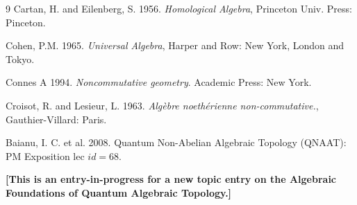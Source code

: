 \documentclass[12pt]{article}
\theoremstyle{plain}
\theoremstyle{definition}
\numberwithin{equation}{section}
\newcommand{\<}{{\langle}}
\begin{document}
\begin{thebibliography} {9}
Cartan, H. and Eilenberg, S. 1956. {\em Homological Algebra}, Princeton Univ. Press: Pinceton. 


Cohen, P.M. 1965. {\em Universal Algebra}, Harper and Row: New York, London and Tokyo.

Connes A 1994. \emph{Noncommutative geometry}. Academic Press: New York.

Croisot, R. and Lesieur, L. 1963. \emph{Alg\`ebre noeth\'erienne non-commutative.},
Gauthier-Villard: Paris.

Baianu, I. C. et al. 2008. Quantum Non-Abelian Algebraic Topology (QNAAT): PM Exposition lec $id=68$.

\end{thebibliography}

\textbf{[This is an entry-in-progress for a new topic entry on the Algebraic Foundations of Quantum Algebraic Topology.]}

\end{document}
